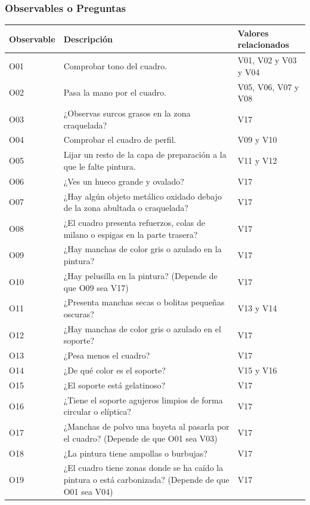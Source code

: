 \documentclass[a4paper,11pt]{article}
\begin{document}
			\subsubsection{Observables o Preguntas}
			\begin{center}
				\begin{tabular}{| p{2cm} | p{6cm} | p{3cm} |}
					\hline
					\cellcolor[RGB]{224,233,250}\textbf{Observable} &
					\cellcolor[RGB]{224,233,250}\textbf{Descripción} &
					\cellcolor[RGB]{224,233,250}\textbf{Valores relacionados}\\
					\hline
O01 & Comprobar tono del cuadro. & V01, V02 y V03 y V04\\
					\hline
O02 & Pasa la mano por el cuadro. & V05, V06, V07 y V08\\
					\hline
O03 & ¿Observas surcos grasos en la zona craquelada? & V17\\
					\hline
O04 & Comprobar el cuadro de perfil. & V09 y V10\\
					\hline
O05 & Lijar un resto de la capa de preparación a la que le falte pintura. &
V11 y V12\\
					\hline
O06 & ¿Ves un hueco grande y ovalado? & V17\\
					\hline
O07 & ¿Hay algún objeto metálico oxidado debajo de la zona abultada o
craquelada? & V17\\
					\hline
O08 & ¿El cuadro presenta refuerzos, colas de milano o espigas en la parte
trasera? & V17\\
					\hline
O09 & ¿Hay manchas de color gris o azulado en la pintura? & V17\\
					\hline
O10 & ¿Hay pelusilla en la pintura? (Depende de que O09 sea V17) & V17\\
					\hline
O11 & ¿Presenta manchas secas o bolitas pequeñas oscuras? & V13 y V14\\
					\hline
O12 & ¿Hay manchas de color gris o azulado en el soporte? & V17\\
					\hline
O13 & ¿Pesa menos el cuadro? & V17\\
					\hline
O14 & ¿De qué color es el soporte? & V15 y V16\\
					\hline
O15 & ¿El soporte está gelatinoso? & V17\\
					\hline
O16 & ¿Tiene el soporte agujeros limpios de forma circular o elíptica? & V17\\
					\hline
O17 & ¿Manchas de polvo una bayeta al pasarla por el cuadro? (Depende de que O01
sea V03) & V17\\
					\hline
O18 & ¿La pintura tiene ampollas o burbujas? & V17\\
					\hline
O19 & ¿El cuadro tiene zonas donde se ha caído la pintura o está carbonizada?
(Depende de que O01 sea V04) & V17\\
					\hline
				\end{tabular}
			\end{center}
			\newpage
\end{document}
